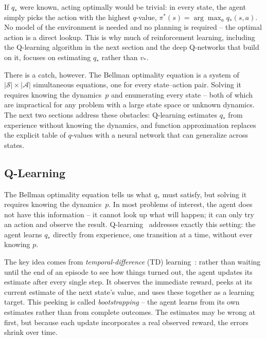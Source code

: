 \smallskip
If $q_*$ were known, acting optimally would be trivial: in every
state, the agent simply picks the action with the highest $q$-value,
$\pi^*(s) = \arg\max_a q_*(s, a)$. No model of the environment is
needed and no planning is required -- the optimal action is a direct
lookup. This is why much of reinforcement learning, including the
Q-learning algorithm in the next section and the deep Q-networks that
build on it, focuses on estimating $q_*$ rather than $v_*$.

\smallskip
There is a catch, however. The Bellman optimality equation is a
system of $|\mathcal{S}| \times |\mathcal{A}|$ simultaneous
equations, one for every state--action pair. Solving it requires
knowing the dynamics~$p$ and enumerating every state -- both of which
are impractical for any problem with a large state space or unknown
dynamics. The next two sections address these obstacles: Q-learning
estimates $q_*$ from experience without knowing the dynamics, and
function approximation replaces the explicit table of $q$-values with
a neural network that can generalize across states.

\subsection{Q-Learning}
\label{subsec:q-learning}

The Bellman optimality equation tells us what $q_*$ must satisfy,
but solving it requires knowing the dynamics~$p$. In most problems
of interest, the agent does not have this information -- it cannot
look up what will happen; it can only try an action and observe the
result. Q-learning~\citep{watkins1992q} addresses exactly this
setting: the agent learns $q_*$ directly from experience, one
transition at a time, without ever knowing $p$.

\smallskip
The key idea comes from \emph{temporal-difference} (TD)
learning~\citep{sutton1988learning}: rather than waiting until
the end of an episode to see how things turned out, the agent
updates its estimate after every single step. It observes the
immediate reward, peeks at its current estimate of the next
state's value, and uses these together as a learning target.
This peeking is called \emph{bootstrapping} -- the agent learns
from its own estimates rather than from complete outcomes. The
estimates may be wrong at first, but because each update
incorporates a real observed reward, the errors shrink over time.

